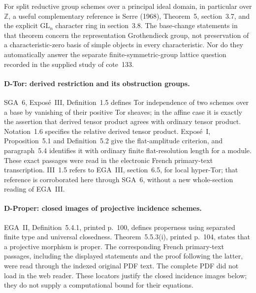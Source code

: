 For split reductive group schemes over a principal ideal domain, in particular over $\mathbb Z$, a useful complementary reference is Serre (1968), Theorem~5, section~3.7, and the explicit $\mathrm{GL}_n$ character ring in section~3.8. The base-change statements in that theorem concern the representation Grothendieck group, not preservation of a characteristic-zero basis of simple objects in every characteristic. Nor do they automatically answer the separate finite-symmetric-group lattice question recorded in the supplied study of cote~133.


\paragraph{D-Tor: derived restriction and its obstruction groups.}
SGA~6, Expos\'e~III, Definition~1.5 defines Tor independence of two
schemes over a base by vanishing of their positive Tor sheaves; in
the affine case it is exactly the assertion that derived tensor
product agrees with ordinary tensor product. Notation~1.6 specifies
the relative derived tensor product. Expos\'e~I, Proposition~5.1
and Definition~5.2 give the flat-amplitude criterion, and paragraph~5.4
identifies it with ordinary finite flat-resolution length for a
module. These exact passages were read in the electronic French
primary-text transcription. III~1.5 refers to EGA~III, section~6.5,
for local hyper-Tor; that reference is corroborated here through
SGA~6, without a new whole-section reading of EGA~III.

\paragraph{D-Proper: closed images of projective incidence schemes.}
EGA~II, Definition~5.4.1, printed p.~100, defines properness
using separated finite type and universal closedness.
Theorem~5.5.3(i), printed p.~104, states that a projective
morphism is proper. The corresponding French primary-text
passages, including the displayed statements and the proof
following the latter, were read through the indexed original
PDF text. The complete PDF did not load in the web reader.
These locators justify the closed incidence images below;
they do not supply a computational bound for their equations.

